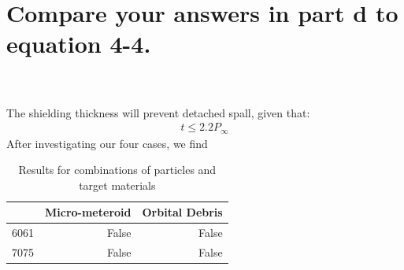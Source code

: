 \documentclass[onecolumn,10pt]{jhwhw}
\begin{document}
\part{Compare your answers in part d to equation 4-4.}
\\
\\
\noindent The shielding thickness will prevent detached spall, given that:
\begin{align*}
t \leq 2.2 P_{\infty}
\end{align*}
\noindent After investigating our four cases, we find
\begin{table}[h]
\begin{center}
\begin{tabular}{r|rr}
\toprule
      &   Micro-meteroid &   Orbital Debris \\
\midrule
 6061 &     False &      False \\
 7075 &     False &      False \\
\bottomrule
\end{tabular}
\end{center}
\caption{Results for combinations of particles and target materials}
\end{table}
\end{document}
